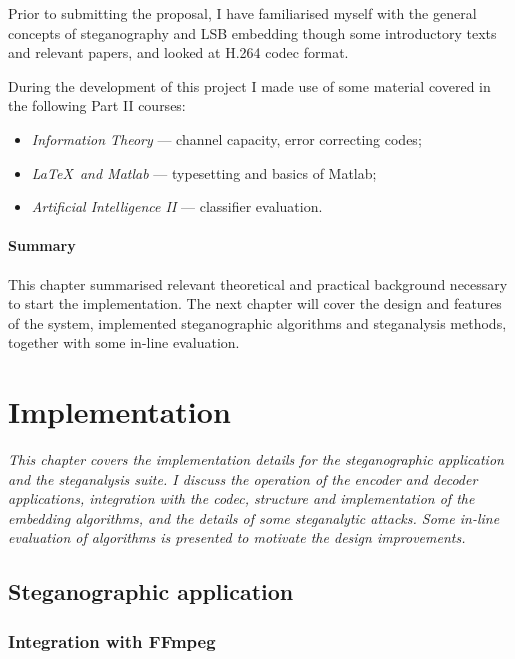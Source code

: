 \documentclass[12pt,british,twoside,notitlepage,usenames,dvipsnames,hypens,final]{report}
\numberwithin{equation}{section}
\numberwithin{figure}{section}
\begin{document}
Prior to submitting the proposal, I have familiarised myself with the general concepts of steganography and LSB embedding though some introductory texts and relevant papers, and looked at H.264 codec format.

During the development of this project I made use of some material covered in the following Part II courses:
\begin{itemize}
\item \textit{Information Theory} --- channel capacity, error correcting codes;
\item \textit{\LaTeX~and Matlab} --- typesetting and basics of Matlab;
\item \textit{Artificial Intelligence II} --- classifier evaluation.
\end{itemize}

\bigskip\bigskip
\subsubsection*{Summary}
This chapter summarised relevant theoretical and practical background necessary to start the implementation. The next chapter will cover the design and features of the system, implemented steganographic algorithms and steganalysis methods, together with some in-line evaluation.

\cleardoublepage
\chapter{Implementation}

\textit{This chapter covers the implementation details for the steganographic application and the steganalysis suite. I discuss the operation of the encoder and decoder applications, integration with the codec, structure and implementation of the embedding algorithms, and the details of some steganalytic attacks. Some in-line evaluation of algorithms is presented to motivate the design improvements.}

\section{Steganographic application}

\subsection{Integration with FFmpeg}
\label{integrate-ffmpeg}
\end{document}
